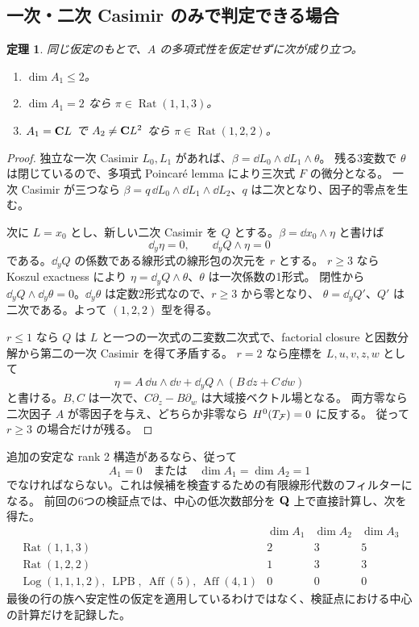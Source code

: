 \documentclass[11pt,a4paper]{ltjsarticle}
\DeclareMathOperator{\Rat}{Rat}\DeclareMathOperator{\Log}{Log}\DeclareMathOperator{\Aff}{Aff}
\DeclareMathOperator{\LPB}{LPB}\DeclareMathOperator{\trdeg}{trdeg}\DeclareMathOperator{\diver}{div}
\newtheorem{theorem}{定理}[section]\newtheorem{proposition}[theorem]{命題}\newtheorem{lemma}[theorem]{補題}\newtheorem{corollary}[theorem]{系}
\theoremstyle{remark}\newtheorem{remark}[theorem]{注意}\renewcommand{\proofname}{証明}
\begin{document}
\subsection{一次・二次 Casimir のみで判定できる場合}
\begin{theorem}\label{thm:low}
同じ仮定のもとで、$A$ の多項式性を仮定せずに次が成り立つ。
\begin{enumerate}
 \item $\dim A_1\le2$。
 \item $\dim A_1=2$ なら $\pi\in\Rat(1,1,3)$。
 \item $A_1=\mathbf C L$ で $A_2\ne\mathbf C L^2$ なら $\pi\in\Rat(1,2,2)$。
\end{enumerate}
\end{theorem}
\begin{proof}
独立な一次 Casimir $L_0,L_1$ があれば、$\beta=\dd L_0\wedge\dd L_1\wedge\theta$。
残る3変数で $\theta$ は閉じているので、多項式 Poincar\'e lemma により三次式 $F$ の微分となる。
一次 Casimir が三つなら $\beta=q\,\dd L_0\wedge\dd L_1\wedge\dd L_2$、$q$ は二次となり、因子的零点を生む。

次に $L=x_0$ とし、新しい二次 Casimir を $Q$ とする。$\beta=\dd x_0\wedge\eta$ と書けば
\[
 \dd_y\eta=0,\qquad \dd_yQ\wedge\eta=0
\]
である。$\dd_yQ$ の係数である線形式の線形包の次元を $r$ とする。
$r\ge3$ なら Koszul exactness により $\eta=\dd_yQ\wedge\theta$、$\theta$ は一次係数の1形式。
閉性から $\dd_yQ\wedge\dd_y\theta=0$。$\dd_y\theta$ は定数2形式なので、$r\ge3$ から零となり、
$\theta=\dd_yQ'$、$Q'$ は二次である。よって $(1,2,2)$ 型を得る。

$r\le1$ なら $Q$ は $L$ と一つの一次式の二変数二次式で、factorial closure と因数分解から第二の一次 Casimir を得て矛盾する。
$r=2$ なら座標を $L,u,v,z,w$ として
\[
 \eta=A\,\dd u\wedge\dd v+\dd_yQ\wedge(B\,\dd z+C\,\dd w)
\]
と書ける。$B,C$ は一次で、$C\partial_z-B\partial_w$ は大域接ベクトル場となる。
両方零なら二次因子 $A$ が零因子を与え、どちらか非零なら $H^0(T_\mathcal F)=0$ に反する。
従って $r\ge3$ の場合だけが残る。
\end{proof}

追加の安定な rank 2 構造があるなら、従って
\[
 A_1=0\quad\text{または}\quad\dim A_1=\dim A_2=1
\]
でなければならない。これは候補を検査するための有限線形代数のフィルターになる。
前回の6つの検証点では、中心の低次数部分を $\mathbf Q$ 上で直接計算し、次を得た。
\[
\begin{array}{c|rrr}
 &\dim A_1&\dim A_2&\dim A_3\\\hline
\Rat(1,1,3)&2&3&5\\
\Rat(1,2,2)&1&3&3\\
\Log(1,1,1,2),\ \LPB,\ \Aff(5),\ \Aff(4,1)&0&0&0
\end{array}
\]
最後の行の族へ安定性の仮定を適用しているわけではなく、検証点における中心の計算だけを記録した。
\end{document}

